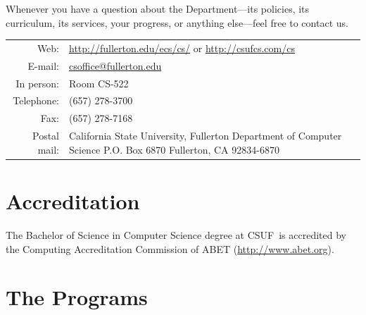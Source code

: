\documentclass{book}
\newcommand{\CampusName}{CSUF}
\newcommand{\shrunkurl}[1]{\url{http://csufcs.com/#1}}
\begin{document}
Whenever you have a question about the Department---its policies, its curriculum, its services, your progress, or anything else---feel free to contact us.

\begin{tabular}{r p{6in}} %
  Web: & \url{http://fullerton.edu/ecs/cs/} or \shrunkurl{cs} \\ \index{website}
  E-mail: & \href{mailto:csoffice@fullerton.edu}{\url{csoffice@fullerton.edu}} \\ \index{e-mail}
  In person: & Room CS-522 \\ \index{department office}
  Telephone: & (657) 278-3700 \\ \index{phone number} \index{telephone number}
  Fax: & (657) 278-7168 \\ \index{fax number}
  Postal mail: & California State University, Fullerton \newline\index{postal address}\index{address}Department of Computer Science \newline
P.O. Box 6870 \newline
Fullerton, CA 92834-6870
\end{tabular}

\section{Accreditation} 

The Bachelor of Science in Computer Science degree at \CampusName~is accredited by the Computing Accreditation Commission of ABET (\url{http://www.abet.org}).

\begin{center}
\end{center}

\section{The Programs}
\end{document}
